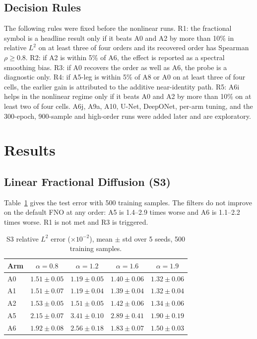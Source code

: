 \documentclass[conference]{IEEEtran}
\begin{document}
\subsection{Decision Rules}
The following rules were fixed before the nonlinear runs. R1: the fractional symbol is a headline result only if it beats A0 and A2 by more than 10\% in relative $L^2$ on at least three of four orders and its recovered order has Spearman $\rho\ge0.8$. R2: if A2 is within 5\% of A6, the effect is reported as a spectral smoothing bias. R3: if A0 recovers the order as well as A6, the probe is a diagnostic only. R4: if A5-leg is within 5\% of A8 or A0 on at least three of four cells, the earlier gain is attributed to the additive near-identity path. R5: A6i helps in the nonlinear regime only if it beats A0 and A2 by more than 10\% on at least two of four cells. A6j, A9a, A10, U-Net, DeepONet, per-arm tuning, and the 300-epoch, 900-sample and high-order runs were added later and are exploratory.

\section{Results}\label{sec:results}

\subsection{Linear Fractional Diffusion (S3)}
Table~\ref{tab:s3} gives the test error with 500 training samples. The filters do not improve on the default FNO at any order: A5 is 1.4--2.9 times worse and A6 is 1.1--2.2 times worse. R1 is not met and R3 is triggered.

\begin{table}[t]
\caption{S3 relative $L^2$ error ($\times10^{-2}$), mean $\pm$ std over 5 seeds, 500 training samples.}
\label{tab:s3}
\centering
\scriptsize
\setlength{\tabcolsep}{3pt}
\begin{tabular}{@{}lcccc@{}}
\toprule
Arm & $\alpha{=}0.8$ & $\alpha{=}1.2$ & $\alpha{=}1.6$ & $\alpha{=}1.9$ \\
\midrule
A0 & $\mathbf{1.51\pm0.05}$ & $\mathbf{1.19\pm0.05}$ & $1.40\pm0.06$ & $\mathbf{1.32\pm0.06}$ \\
A1 & $\mathbf{1.51\pm0.07}$ & $\mathbf{1.19\pm0.04}$ & $\mathbf{1.39\pm0.04}$ & $\mathbf{1.32\pm0.04}$ \\
A2 & $1.53\pm0.05$ & $1.51\pm0.05$ & $1.42\pm0.06$ & $1.34\pm0.06$ \\
A5 & $2.15\pm0.07$ & $3.41\pm0.10$ & $2.89\pm0.41$ & $1.90\pm0.19$ \\
A6 & $1.92\pm0.08$ & $2.56\pm0.18$ & $1.83\pm0.07$ & $1.50\pm0.03$ \\
\bottomrule
\end{tabular}
\end{table}
\end{document}

